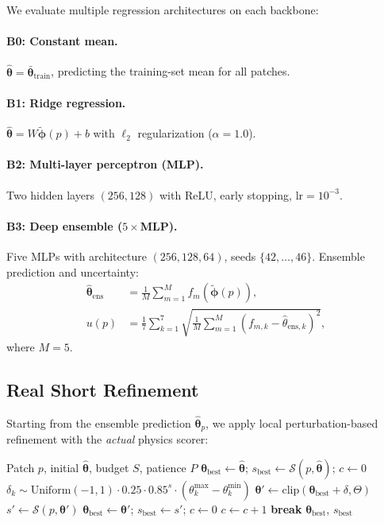 \documentclass[11pt,a4paper]{article}
\newcommand{\btheta}{\boldsymbol{\theta}}
\newcommand{\bphi}{\boldsymbol{\phi}}
\newcommand{\cS}{\mathcal{S}}
\begin{document}
We evaluate multiple regression architectures on each backbone:

\paragraph{B0: Constant mean.}
$\hat{\btheta} = \bar{\btheta}_\text{train}$, predicting the training-set mean
for all patches.

\paragraph{B1: Ridge regression.}
$\hat{\btheta} = W \tilde{\bphi}(p) + b$ with $\ell_2$ regularization ($\alpha = 1.0$).

\paragraph{B2: Multi-layer perceptron (MLP).}
Two hidden layers $(256, 128)$ with ReLU, early stopping, $\text{lr}=10^{-3}$.

\paragraph{B3: Deep ensemble ($5{\times}$MLP).}
Five MLPs with architecture $(256, 128, 64)$, seeds $\{42, \ldots, 46\}$.
Ensemble prediction and uncertainty:
\begin{align}
\hat{\btheta}_\text{ens} &= \frac{1}{M} \sum_{m=1}^{M} f_m(\tilde{\bphi}(p)), \\
u(p) &= \frac{1}{7} \sum_{k=1}^{7} \sqrt{\frac{1}{M} \sum_{m=1}^{M}
  (f_{m,k} - \hat{\theta}_{\text{ens},k})^2},
\label{eq:uncertainty}
\end{align}
where $M=5$.

\subsection{Real Short Refinement}
\label{sec:refinement}

Starting from the ensemble prediction $\hat{\btheta}_p$, we apply
local perturbation-based refinement with the \emph{actual} physics scorer:

\begin{algorithm}[h]
\caption{Patch-Level Real Short Refinement}
\label{alg:refinement}
\begin{algorithmic}[1]
\REQUIRE Patch $p$, initial $\hat{\btheta}$, budget $S$, patience $P$
\STATE $\btheta_\text{best} \leftarrow \hat{\btheta}$; $s_\text{best} \leftarrow \cS(p, \hat{\btheta})$; $c \leftarrow 0$
  \STATE $\delta_k \sim \text{Uniform}(-1, 1) \cdot 0.25 \cdot 0.85^s \cdot (\theta_k^\text{max} - \theta_k^\text{min})$
  \STATE $\btheta' \leftarrow \text{clip}(\btheta_\text{best} + \delta, \Theta)$
  \STATE $s' \leftarrow \cS(p, \btheta')$
    \STATE $\btheta_\text{best} \leftarrow \btheta'$; $s_\text{best} \leftarrow s'$; $c \leftarrow 0$
  \ELSE
    \STATE $c \leftarrow c + 1$
  \ENDIF
   \textbf{break} \ENDIF
\ENDFOR
\RETURN $\btheta_\text{best}$, $s_\text{best}$
\end{algorithmic}
\end{algorithm}
\end{document}
